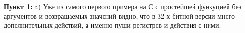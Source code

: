 \documentclass[a4paper,12pt]{article}
\begin{document}
\textbf{Пункт 1:}
a) Уже из самого первого примера на С с простейшей функуцией без аргументов и возвращаемых значений видно, что в 32-х битной версии много дополнительных действий, а именно пуши регистров и действия с ними.   
\begin{figure}[H]\label{fig: BezArgumentovFuncNaC 64 and 32}
\end{figure}
\end{document}
